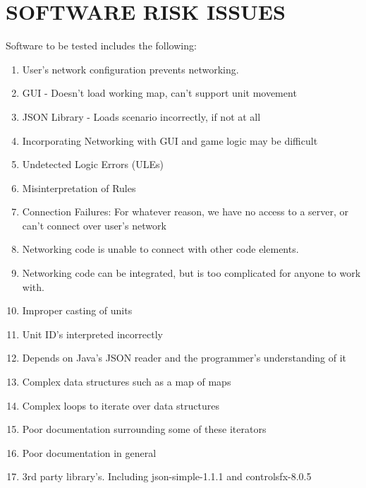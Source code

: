 {\section[SOFTWARE RISK ISSUES]{\bfseries\color{black} SOFTWARE RISK ISSUES}
{\color{black}
Software to be tested includes the following:

\begin{enumerate}

\item User's network configuration prevents networking.
  
\item  GUI - Doesn't load working map, can't support unit movement
\item  JSON Library - Loads scenario incorrectly, if not at all
\item  Incorporating Networking with GUI and game logic may be difficult
\item  Undetected Logic Errors (ULEs)
\item  Misinterpretation of Rules
\item  Connection Failures: For whatever reason, we have no access to a server, or can't connect over user's network
\item  Networking code is unable to connect with other code elements.
\item  Networking code can be integrated, but is too complicated for anyone to work with.
\item Improper casting of units
\item Unit ID's interpreted incorrectly
\item Depends on Java's JSON reader and the programmer's understanding of it
\item Complex data structures such as a map of maps
\item Complex loops to iterate over data structures
\item Poor documentation surrounding some of these iterators
\item Poor documentation in general
\item 3rd party library's. Including json-simple-1.1.1 and controlsfx-8.0.5
\end{enumerate}
}
}

